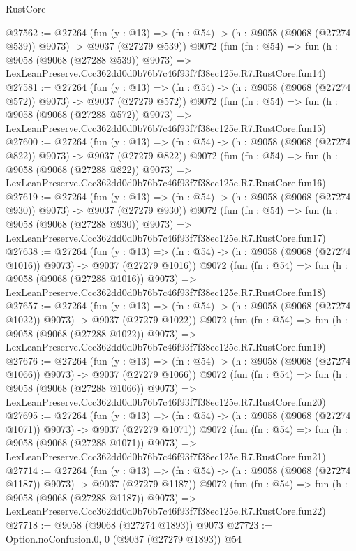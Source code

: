 \begin{lexlean}{RustCore}
\begin{coremodule}
@27562 := @27264
    (fun (y : @13) => (fn : @54) -> (h : @9058 (@9068 (@27274 @539)) @9073) -> @9037 (@27279 @539))
    @9072
    (fun (fn : @54) =>
    fun (h : @9058 (@9068 (@27288 @539)) @9073) =>
    LexLeanPreserve.Ccc362dd0d0b76b7c46f93f7f38ec125e.R7.RustCore.fun14)
@27581 := @27264
    (fun (y : @13) => (fn : @54) -> (h : @9058 (@9068 (@27274 @572)) @9073) -> @9037 (@27279 @572))
    @9072
    (fun (fn : @54) =>
    fun (h : @9058 (@9068 (@27288 @572)) @9073) =>
    LexLeanPreserve.Ccc362dd0d0b76b7c46f93f7f38ec125e.R7.RustCore.fun15)
@27600 := @27264
    (fun (y : @13) => (fn : @54) -> (h : @9058 (@9068 (@27274 @822)) @9073) -> @9037 (@27279 @822))
    @9072
    (fun (fn : @54) =>
    fun (h : @9058 (@9068 (@27288 @822)) @9073) =>
    LexLeanPreserve.Ccc362dd0d0b76b7c46f93f7f38ec125e.R7.RustCore.fun16)
@27619 := @27264
    (fun (y : @13) => (fn : @54) -> (h : @9058 (@9068 (@27274 @930)) @9073) -> @9037 (@27279 @930))
    @9072
    (fun (fn : @54) =>
    fun (h : @9058 (@9068 (@27288 @930)) @9073) =>
    LexLeanPreserve.Ccc362dd0d0b76b7c46f93f7f38ec125e.R7.RustCore.fun17)
@27638 := @27264
    (fun (y : @13) =>
    (fn : @54) -> (h : @9058 (@9068 (@27274 @1016)) @9073) -> @9037 (@27279 @1016))
    @9072
    (fun (fn : @54) =>
    fun (h : @9058 (@9068 (@27288 @1016)) @9073) =>
    LexLeanPreserve.Ccc362dd0d0b76b7c46f93f7f38ec125e.R7.RustCore.fun18)
@27657 := @27264
    (fun (y : @13) =>
    (fn : @54) -> (h : @9058 (@9068 (@27274 @1022)) @9073) -> @9037 (@27279 @1022))
    @9072
    (fun (fn : @54) =>
    fun (h : @9058 (@9068 (@27288 @1022)) @9073) =>
    LexLeanPreserve.Ccc362dd0d0b76b7c46f93f7f38ec125e.R7.RustCore.fun19)
@27676 := @27264
    (fun (y : @13) =>
    (fn : @54) -> (h : @9058 (@9068 (@27274 @1066)) @9073) -> @9037 (@27279 @1066))
    @9072
    (fun (fn : @54) =>
    fun (h : @9058 (@9068 (@27288 @1066)) @9073) =>
    LexLeanPreserve.Ccc362dd0d0b76b7c46f93f7f38ec125e.R7.RustCore.fun20)
@27695 := @27264
    (fun (y : @13) =>
    (fn : @54) -> (h : @9058 (@9068 (@27274 @1071)) @9073) -> @9037 (@27279 @1071))
    @9072
    (fun (fn : @54) =>
    fun (h : @9058 (@9068 (@27288 @1071)) @9073) =>
    LexLeanPreserve.Ccc362dd0d0b76b7c46f93f7f38ec125e.R7.RustCore.fun21)
@27714 := @27264
    (fun (y : @13) =>
    (fn : @54) -> (h : @9058 (@9068 (@27274 @1187)) @9073) -> @9037 (@27279 @1187))
    @9072
    (fun (fn : @54) =>
    fun (h : @9058 (@9068 (@27288 @1187)) @9073) =>
    LexLeanPreserve.Ccc362dd0d0b76b7c46f93f7f38ec125e.R7.RustCore.fun22)
@27718 := @9058 (@9068 (@27274 @1893)) @9073
@27723 := Option.noConfusion.{0, 0} (@9037 (@27279 @1893)) @54

\end{coremodule}
\end{lexlean}
